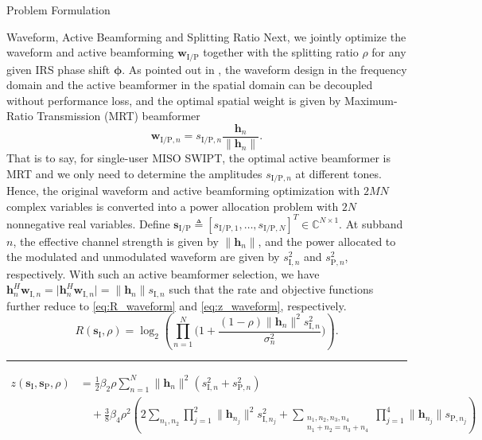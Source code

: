 \documentclass[journal]{IEEEtran}
\begin{document}
\begin{section}{Problem Formulation}
		\begin{subsection}{Waveform, Active Beamforming and Splitting Ratio}
			Next, we jointly optimize the waveform and active beamforming $\boldsymbol{w}_{\mathrm{I/P}}$ together with the splitting ratio $\rho$ for any given IRS phase shift $\boldsymbol{\phi}$. As pointed out in \cite{Clerckx2018b}, the waveform design in the frequency domain and the active beamformer in the spatial domain can be decoupled without performance loss, and the optimal spatial weight is given by Maximum-Ratio Transmission (MRT) beamformer
			\begin{equation}\label{eq:w_IP}
				\boldsymbol{w}_{\mathrm{I/P},n}=s_{\mathrm{I/P},n}\frac{\boldsymbol{h}_n}{\lVert{\boldsymbol{h}_n}\rVert}.
			\end{equation}
			That is to say, for single-user MISO SWIPT, the optimal active beamformer is MRT and we only need to determine the amplitudes $s_{\mathrm{I/P},n}$ at different tones. Hence, the original waveform and active beamforming optimization with $2MN$ complex variables is converted into a power allocation problem with $2N$ nonnegative real variables. Define $\boldsymbol{s}_{\mathrm{I/P}} \triangleq [s_{\mathrm{I/P},1},\dots,s_{\mathrm{I/P},N}]^T \in \mathbb{C}^{N \times 1}$. At subband $n$, the effective channel strength is given by $\lVert{\boldsymbol{h}_n}\rVert$, and the power allocated to the modulated and unmodulated waveform are given by $s_{\mathrm{I},n}^2$ and $s_{\mathrm{P},n}^2$, respectively. With such an active beamformer selection, we have $\boldsymbol{h}_n^H\boldsymbol{w}_{\mathrm{I},n}=\lvert{\boldsymbol{h}_n^H\boldsymbol{w}_{\mathrm{I},n}}\rvert=\lVert{\boldsymbol{h}_n}\rVert s_{\mathrm{I},n}$ such that the rate and objective functions further reduce to \eqref{eq:R_waveform} and \eqref{eq:z_waveform}, respectively.
			\begin{equation}\label{eq:R_waveform}
				R(\boldsymbol{s}_{\mathrm{I}},\rho) = \log_2\left(\prod_{n=1}^N\biggl(1+\frac{(1-\rho)\lVert{\boldsymbol{h}_n}\rVert^2 s_{\mathrm{I},n}^2}{\sigma_n^2}\biggr)\right).
			\end{equation}
			\begin{figure*}[b]
				\hrule
				\begin{align}
					z(\boldsymbol{s}_{\mathrm{I}},\boldsymbol{s}_\mathrm{P},\rho)
					& = \frac{1}{2}{\beta_2}{\rho} \sum_{n=1}^N \lVert{\boldsymbol{h}_n}\rVert^2(s_{\mathrm{I},n}^2+s_{\mathrm{P},n}^2)\nonumber\\
					& \quad + \frac{3}{8}{\beta_4}{\rho^2} \left( 2\sum_{n_1,n_2} \prod_{j=1}^2 \lVert{\boldsymbol{h}_{n_j}}\rVert^2 s_{\mathrm{I},{n_j}}^2 + \sum_{\substack{{n_1},{n_2},{n_3},{n_4}\\{n_1}+{n_2}={n_3}+{n_4}}} \prod_{j=1}^4 \lVert{\boldsymbol{h}_{n_j}}\rVert s_{\mathrm{P},{n_j}} \right)\nonumber\\

\end{align}
\end{figure*}
\end{subsection}
\end{section}
\end{document}
